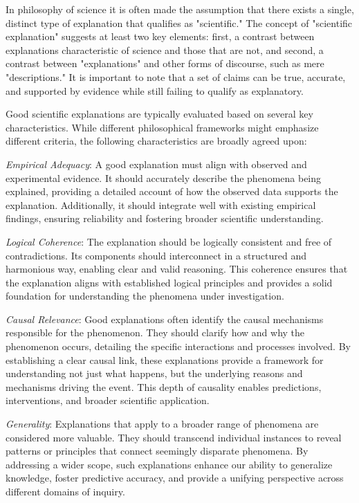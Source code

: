 In philosophy of science it is often made the assumption that there exists a single, distinct type of explanation that qualifies as "scientific." The concept of "scientific explanation" suggests at least two key elements: first, a contrast between explanations characteristic of science and those that are not, and second, a contrast between "explanations" and other forms of discourse, such as mere "descriptions." It is important to note that a set of claims can be true, accurate, and supported by evidence while still failing to qualify as explanatory.

Good scientific explanations are typically evaluated based on several key characteristics. While different philosophical frameworks might emphasize different criteria, the following characteristics are broadly agreed upon:

\emph{Empirical Adequacy}: A good explanation must align with observed and experimental evidence. It should accurately describe the phenomena being explained, providing a detailed account of how the observed data supports the explanation. Additionally, it should integrate well with existing empirical findings, ensuring reliability and fostering broader scientific understanding.

\emph{Logical Coherence}: The explanation should be logically consistent and free of contradictions. Its components should interconnect in a structured and harmonious way, enabling clear and valid reasoning. This coherence ensures that the explanation aligns with established logical principles and provides a solid foundation for understanding the phenomena under investigation.

\emph{Causal Relevance}: Good explanations often identify the causal mechanisms responsible for the phenomenon. They should clarify how and why the phenomenon occurs, detailing the specific interactions and processes involved. By establishing a clear causal link, these explanations provide a framework for understanding not just what happens, but the underlying reasons and mechanisms driving the event. This depth of causality enables predictions, interventions, and broader scientific application.

\emph{Generality}: Explanations that apply to a broader range of phenomena are considered more valuable. They should transcend individual instances to reveal patterns or principles that connect seemingly disparate phenomena. By addressing a wider scope, such explanations enhance our ability to generalize knowledge, foster predictive accuracy, and provide a unifying perspective across different domains of inquiry.

